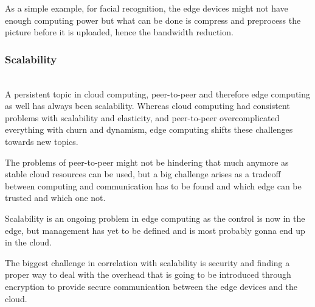As a simple example, for facial recognition, the edge devices might not have enough computing power but what can be done is compress and preprocess the picture before it is uploaded, hence the bandwidth reduction.

\subsubsection{Scalability}\hspace*{\fill} \\
A persistent topic in cloud computing, peer-to-peer and therefore edge computing as well has always been scalability.
Whereas cloud computing had consistent problems with scalability and elasticity, and peer-to-peer overcomplicated everything with churn and dynamism, edge computing shifts these challenges towards new topics.

The problems of peer-to-peer might not be hindering that much anymore as stable cloud resources can be used, but a big challenge arises as a tradeoff between computing and communication has to be found \cite{7488250}\cite{GarciaLopez:2015:ECV:2831347.2831354} and which edge can be trusted and which one not.

Scalability is an ongoing problem in edge computing as the control is now in the edge, but management has yet to be defined and is most probably gonna end up in the cloud.

The biggest challenge in correlation with scalability is security and finding a proper way to deal with the overhead that is going to be introduced through encryption to provide secure communication between the edge devices and the cloud.

